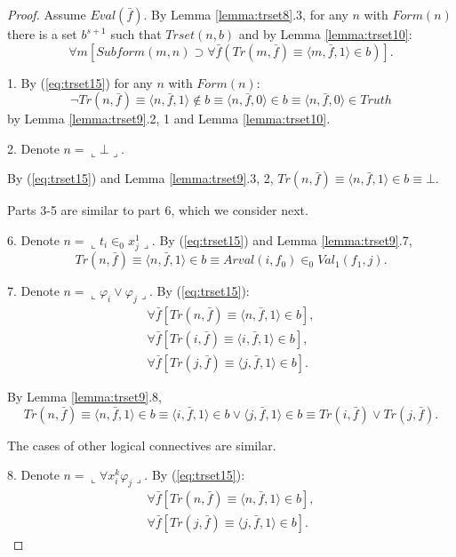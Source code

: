 \documentclass{asl}
\theoremstyle{definition}
\begin{document}
\begin{proof}
Assume $Eval(\bar{f})$. By Lemma \ref{lemma:trset8}.3, for any $n$ with $Form(n)$ there is a set $b^{s+1}$ such that $Trset(n,b)$ and by Lemma \ref{lemma:trset10}:
\begin{equation}
\forall m \left[Subform(m,n)\supset\forall \bar{f}(Tr( m,\bar{f})\equiv\langle m,\bar{f},1\rangle\in b) \right].
\label{eq:trset15}
\end{equation}

1. By (\ref{eq:trset15}) for any $n$ with $Form(n)$:
\[\neg Tr( n,\bar{f})\equiv\langle n,\bar{f},1\rangle\notin b\equiv\langle n,\bar{f},0\rangle\in b
\equiv\langle n,\bar{f},0\rangle\in Truth\]
by Lemma \ref{lemma:trset9}.2, 1 and Lemma \ref{lemma:trset10}.

2. Denote $n=\llcorner\bot\lrcorner$. 

By  (\ref{eq:trset15}) and Lemma \ref{lemma:trset9}.3, 2, $Tr( n,\bar{f})\equiv\langle n,\bar{f},1\rangle\in b\equiv\bot$.

Parts 3-5 are similar to part 6, which we consider next.

6. Denote $n=\llcorner t_i\in_0 x_j^1 \lrcorner$. By (\ref{eq:trset15}) and Lemma \ref{lemma:trset9}.7, 
\[Tr( n,\bar{f})\equiv\langle n,\bar{f},1\rangle\in b\equiv Arval(i,f_0)\in_0 Val_1(f_1,j). \] 

7. Denote $n=\llcorner \varphi_i\vee \varphi_j \lrcorner$. By (\ref{eq:trset15}):
\begin{eqnarray*}
\forall \bar{f} \left[Tr( n,\bar{f})\equiv\langle  n,\bar{f},1\rangle\in b\right] ,
\\
\forall \bar{f} \left[Tr( i,\bar{f})\equiv\langle  i,\bar{f},1\rangle\in b\right],
\\
\forall \bar{f} \left[Tr( j,\bar{f})\equiv\langle  j,\bar{f},1\rangle\in b\right].
\end{eqnarray*}

By Lemma \ref{lemma:trset9}.8,
\[Tr(n,\bar{f})
\equiv \langle n,\bar{f},1\rangle \in b\equiv
\langle i,\bar{f},1\rangle\in b \vee\langle j,\bar{f},1\rangle\in b 
\equiv Tr(i,\bar{f})\vee Tr(j,\bar{f}). \]

The cases of other logical connectives are similar.

8. Denote $n=\llcorner \forall x_i^k\varphi_j \lrcorner$. By (\ref{eq:trset15}):
\begin{eqnarray*}
\forall \bar{f} \left[Tr( n,\bar{f})\equiv\langle  n,\bar{f},1\rangle\in b\right] ,
\\
\forall \bar{f} \left[Tr( j,\bar{f})\equiv\langle  j,\bar{f},1\rangle\in b\right].
\end{eqnarray*}


\end{proof}
\end{document}
